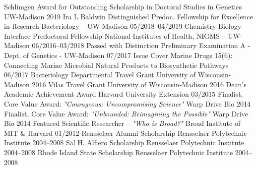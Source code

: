 

\begin{cvhonors}
  \cvhonor
    {Schlimgen Award for Outstanding Scholarship in Doctoral Studies in Genetics} %
    {UW-Madison} %
    {2019} %
  \cvhonor
    {Ira L Baldwin Distinguished Predoc. Fellowship for Excellence in Research} %
    {Bacteriology -- UW-Madison} %
    {05/2018--04/2019} %
  \cvhonor
    {Chemistry-Biology Interface Predoctoral Fellowship} %
    {National Institutes of Health, NIGMS -- UW-Madison} %
    {06/2016--03/2018} %
  \cvhonor
    {Passed with Distinction} %
    {Preliminary Examination A - Dept. of Genetics - UW-Madison} %
    {07/2017} %
  \cvhonor
    {Issue Cover} %
    {Marine Drugs 15(6): Connecting Marine Microbial Natural Products to Biosynthetic Pathways} %
    {06/2017} %
  \cvhonor
    {Bacteriology Departmental Travel Grant} %
    {University of Wisconsin-Madison} %
    {2016} %
  \cvhonor
    {Vilas Travel Grant} %
    {University of Wisconsin-Madison} %
    {2016} %
  \cvhonor
    {Dean's Academic Achievement Award} %
    {Harvard University Extension} %
    {03/2015} %
  \cvhonor
    {Finalist, Core Value Award: \textit{"Courageous: Uncompromising Science"}} %
    {Warp Drive Bio} %
    {2014} %
  \cvhonor
    {Finalist, Core Value Award: \textit{"Unbounded: Reimagining the Possible"}} %
    {Warp Drive Bio} %
    {2014} %
  \cvhonor
    {Featured Scientific Researcher -- \textit{"Who is Broad?"}} %
    {Broad Institute of MIT \& Harvard} %
    {01/2012} %
  \cvhonor
    {Rensselaer Alumni Scholarship} %
    {Rensselaer Polytechnic Institute} %
    {2004--2008} %
  \cvhonor
    {Sal H. Alfiero Scholarship} %
    {Rensselaer Polytechnic Institute} %
    {2004--2008} %
  \cvhonor
    {Rhode Island State Scholarship} %
    {Rensselaer Polytechnic Institute} %
    {2004--2008} %
\end{cvhonors}
